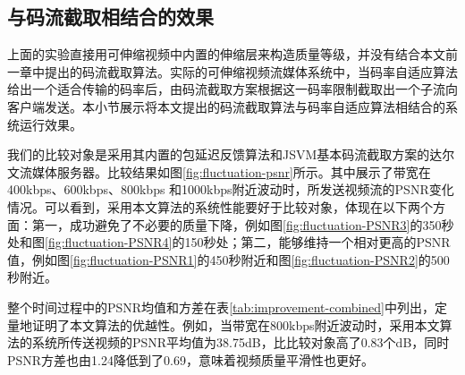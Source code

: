 \subsection{与码流截取相结合的效果}

上面的实验直接用可伸缩视频中内置的伸缩层来构造质量等级，并没有结合本文前一章中提出的码流截取算法。实际的可伸缩视频流媒体系统中，当码率自适应算法给出一个适合传输的码率后，由码流截取方案根据这一码率限制截取出一个子流向客户端发送。本小节展示将本文提出的码流截取算法与码率自适应算法相结合的系统运行效果。

我们的比较对象是采用其内置的包延迟反馈算法和JSVM基本码流截取方案的达尔文流媒体服务器。比较结果如图\ref{fig:fluctuation-psnr}所示。其中展示了带宽在400kbps、600kbps、800kbps
和1000kbps附近波动时，所发送视频流的PSNR变化情况。可以看到，采用本文算法的系统性能要好于比较对象，体现在以下两个方面：第一，成功避免了不必要的质量下降，例如图\ref{fig:fluctuation-PSNR3}的350秒处和图\ref{fig:fluctuation-PSNR4}的150秒处；第二，能够维持一个相对更高的PSNR值，例如图\ref{fig:fluctuation-PSNR1}的450秒附近和图\ref{fig:fluctuation-PSNR2}的500秒附近。

整个时间过程中的PSNR均值和方差在表\ref{tab:improvement-combined}中列出，定量地证明了本文算法的优越性。例如，当带宽在800kbps附近波动时，采用本文算法的系统所传送视频的PSNR平均值为38.75dB，比比较对象高了0.83个dB，同时PSNR方差也由1.24降低到了0.69，意味着视频质量平滑性也更好。

